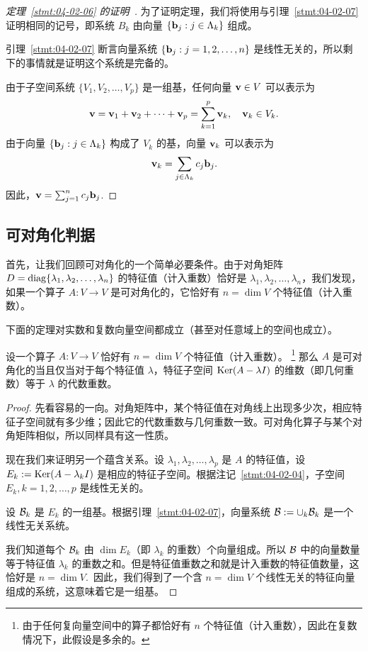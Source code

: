 \begin{proof}[\normalfont\heiti 定理~\ref{stmt:04-02-06} 的证明~\nopunct]为了证明定理，我们将使用与引理~\ref{stmt:04-02-07} 证明相同的记号，即系统 $B_k$ 由向量 $\{\mathbf{b}_j : j \in \Lambda_k\}$ 组成。

引理~\ref{stmt:04-02-07} 断言向量系统 $\{\mathbf{b}_j : j = 1, 2, \dots, n\}$ 是线性无关的，所以剩下的事情就是证明这个系统是完备的。

由于子空间系统 $\{V_1, V_2, \dots, V_p\}$ 是一组基，任何向量 $\mathbf{v} \in V$ 可以表示为
$$\mathbf{v} = \mathbf{v}_1 + \mathbf{v}_2 + \dots + \mathbf{v}_p = \sum_{k=1}^p \mathbf{v}_k,\quad \mathbf{v}_k \in V_k.$$
由于向量 $\{\mathbf{b}_j : j \in \Lambda_k\}$ 构成了 $V_k$ 的基，向量 $\mathbf{v}_k$ 可以表示为
$$\mathbf{v}_k = \sum_{j \in \Lambda_k} c_j \mathbf{b}_j.$$
因此，$\mathbf{v} = \sum_{j=1}^n c_j \mathbf{b}_j$.\end{proof}

\subsection{可对角化判据}\label{sec:04-02-05}

首先，让我们回顾可对角化的一个简单必要条件。由于对角矩阵 $D = \operatorname{diag}\{\lambda_1, \lambda_2, \dots, \lambda_n\}$ 的特征值（计入重数）恰好是 $\lambda_1, \lambda_2, \dots, \lambda_n$，我们发现，如果一个算子 $A: V \to V$ 是可对角化的，它恰好有 $n = \dim V$ 个特征值（计入重数）。

下面的定理对实数和复数向量空间都成立（甚至对任意域上的空间也成立）。

\begin{theorem}\label{stmt:04-02-08} 设一个算子 $A: V \to V$ 恰好有 $n = \dim V$ 个特征值（计入重数）。
\footnote{
由于任何复向量空间中的算子都恰好有 $n$ 个特征值（计入重数），因此在复数情况下，此假设是多余的。
}
那么 $A$ 是可对角化的当且仅当对于每个特征值 $\lambda$，特征子空间 $\operatorname{Ker}(A - \lambda I)$ 的维数（即几何重数）等于 $\lambda$ 的代数重数。\end{theorem}

\begin{proof}先看容易的一向。对角矩阵中，某个特征值在对角线上出现多少次，相应特征子空间就有多少维；因此它的代数重数与几何重数一致。可对角化算子与某个对角矩阵相似，所以同样具有这一性质。

现在我们来证明另一个蕴含关系。设 $\lambda_1, \lambda_2, \dots, \lambda_p$ 是 $A$ 的特征值，设 $E_k := \operatorname{Ker}(A - \lambda_k I)$ 是相应的特征子空间。根据注记~\ref{stmt:04-02-04}，子空间 $E_k,k=1,2,\dots,p$ 是线性无关的。

设 $\mathcal{B}_k$ 是 $E_k$ 的一组基。根据引理~\ref{stmt:04-02-07}，向量系统 $\mathcal{B} := \cup_k \mathcal{B}_k$ 是一个线性无关系统。

我们知道每个 $\mathcal{B}_k$ 由 $\dim E_k$（即 $\lambda_k$ 的重数）个向量组成。所以 $\mathcal{B}$ 中的向量数量等于特征值 $\lambda_k$ 的重数之和。但是特征值重数之和就是计入重数的特征值数量，这恰好是 $n = \dim V$.~因此，我们得到了一个含 $n = \dim V$ 个线性无关的特征向量组成的系统，这意味着它是一组基。\end{proof}

